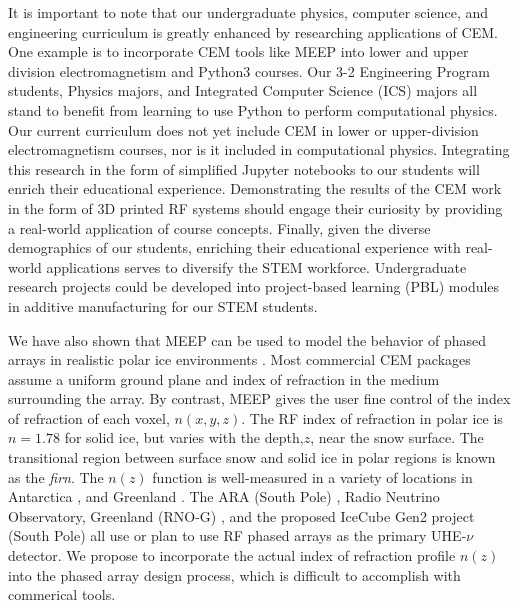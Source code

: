 \documentclass[../../main.tex]{subfiles}
\begin{document}
It is important to note that our undergraduate physics, computer science, and engineering curriculum is greatly enhanced by researching applications of CEM.  One example is to incorporate CEM tools like MEEP into lower and upper division electromagnetism and Python3 courses.  Our 3-2 Engineering Program students, Physics majors, and Integrated Computer Science (ICS) majors all stand to benefit from learning to use Python to perform computational physics.  Our current curriculum does not yet include CEM in lower or upper-division electromagnetism courses, nor is it included in computational physics.  Integrating this research in the form of simplified Jupyter notebooks to our students will enrich their educational experience.  Demonstrating the results of the CEM work in the form of 3D printed RF systems should engage their curiosity by providing a real-world application of course concepts.  Finally, given the diverse demographics of our students, enriching their educational experience with real-world applications serves to diversify the STEM workforce.  Undergraduate research projects could be developed into project-based learning (PBL) modules in additive manufacturing for our STEM students. \\ \vspace{2.5mm}

We have also shown that MEEP can be used to model the behavior of phased arrays in realistic polar ice environments \cite{electronics10040415,meepcon2022,10.1016/j.cpc.2009.11.008}.  Most commercial CEM packages assume a uniform ground plane and index of refraction in the medium surrounding the array.  By contrast, MEEP gives the user fine control of the index of refraction of each voxel, $n(x,y,z)$.  The RF index of refraction in polar ice is $n = 1.78$ for solid ice, but varies with the depth,$z$, near the snow surface.  The transitional region between surface snow and solid ice in polar regions is known as the \textit{firn}.  The $n(z)$ function is well-measured in a variety of locations in Antarctica \cite{horizPaper}, and Greenland \cite{deaconu_2018}.  The ARA (South Pole) \cite{PhysRevD.105.122006}, Radio Neutrino Observatory, Greenland (RNO-G) \cite{rno}, and the proposed IceCube Gen2 project (South Pole) \cite{Aartsen_2021} all use or plan to use RF phased arrays as the primary UHE-$\nu$ detector.  We propose to incorporate the actual index of refraction profile $n(z)$ into the phased array design process, which is difficult to accomplish with commerical tools. \\ \vspace{2.5mm}
\end{document}
